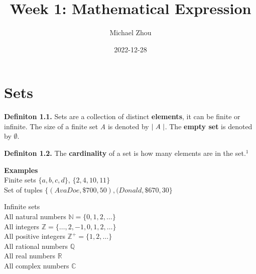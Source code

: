 \documentclass{article}
\title{Week 1: Mathematical Expression}
\author{Michael Zhou}
\date{2022-12-28}
\begin{document}
\maketitle

\section{Sets}

\setlength{\parindent}{0pt}
    

\textbf{Definiton 1.1.} Sets are a collection of distinct \textbf{elements}, it can
be finite or infinite. The size of a finite set \emph{A} is denoted by 
$\mid\emph{A}\mid$.
The \textbf{empty set} is denoted by $\emptyset$.

\textbf{Definiton 1.2.} The \textbf{cardinality} of a set is how many elements
are in the set.$^{1}$

\textbf{Examples}\\
Finite sets \hfill $\{a, b, c, d\}$, $\{2, 4, 10, 11\}$ \\
Set of tuples \hfill $\{(Ava Doe, \$ 700, 50), (Donald,\$ 670, 30\}$ 

Infinite sets \\ 
All natural numbers \hfill$\mathbb{N} = \{ 0, 1, 2, \ldots \} $ \\
All integers \hfill$\mathbb{Z} = \{\ldots, 2, -1, 0, 1, 2, \ldots\} $ \\
All positive integers \hfill$\mathbb{Z}^{+} = \{1, 2, \ldots\} $ \\
All rational numbers \hfill $ \mathbb{Q} $ \\
All real numbers \hfill $ \mathbb{R} $ \\
All complex numbers \hfill $ \mathbb{C} $ 

\end{document}
